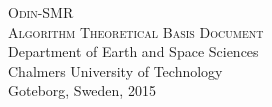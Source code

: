 \thispagestyle{empty}
\begin{center}
\large
\LARGE
\textsc{Odin-SMR \\ Algorithm Theoretical Basis Document}\\[20mm]
\LARGE
\large
Department of Earth and Space Sciences\\
Chalmers University of Technology\\
Goteborg, Sweden, 2015
\end{center}
